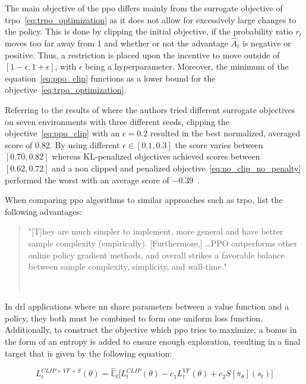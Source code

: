 \documentclass[draft,final]{vutinfth} %
\newcommand{\p}[1]{see p. #1}
\begin{document}
    The main objective of the \gls{ppo} differs mainly from the surrogate objective of \gls{trpo}~\eqref{eq:trpo_optimization} as it does not allow for excessively large changes to the policy.
    This is done by clipping the initial objective, if the probability ratio $r_t$ moves too far away from 1 and whether or not the advantage $\hat{A}_t$ is negative or positive.
    Thus, a restriction is placed upon the incentive to move outside of $[1-\epsilon,1+\epsilon]$, with $\epsilon$ being a hyperparameter.
    Moreover, the minimum of the equation~\ref{eq:ppo_clip} functions as a lower bound for the objective~\ref{eq:trpo_optimization}.

    Referring to the results of \citeauthor{francois-lavet_introduction_2018} where the authors tried different surrogate objectives on seven environments with three different seeds, clipping the objective~\eqref{eq:ppo_clip} with an $\epsilon=0.2$ resulted in the best normalized, averaged score of 0.82.
    By using different $\epsilon \in [0.1,0.3]$ the score varies between $[0.70,0.82]$ whereas KL-penalized objectives achieved scores between $[0.62,0.72]$ and a non clipped and penalized objective~\eqref{eq:no_clip_no_penalty} performed the worst with an average score of $-0.39$~\citep[see Table 1]{francois-lavet_introduction_2018}.

    When comparing \gls{ppo} algorithms to similar approaches such as \gls{trpo}, \citeauthor{francois-lavet_introduction_2018} list the following advantages:

    \begin{quote}
        "[T]hey are much simpler to implement, more general and have better sample complexity (empirically). [Furthermore,] \ldots PPO outperforms other online policy gradient methods, and overall strikes a favorable balance between sample complexity, simplicity, and wall-time."

        \hfill ~\citep[\p{1}]{francois-lavet_introduction_2018}
    \end{quote}

    In \gls{drl} applications where \gls{nn} share parameters between a value function and a policy, they both must be combined to form one uniform loss function.
    Additionally, to construct the objective which \gls{ppo} tries to maximize, a bonus in the form of an entropy is added to ensure enough exploration, resulting in a final target that is given by the following equation:

    \begin{equation}
        L_t^{CLIP+VF+S}(\theta) = \hat{\mathbb{E}}_t\bigg[L_t^{CLIP}(\theta) - c_1L_t^{VF}(\theta) + c_2S[\pi_\theta](s_t)\bigg]\label{eq:ppo_objective}
    \end{equation}
\end{document}
